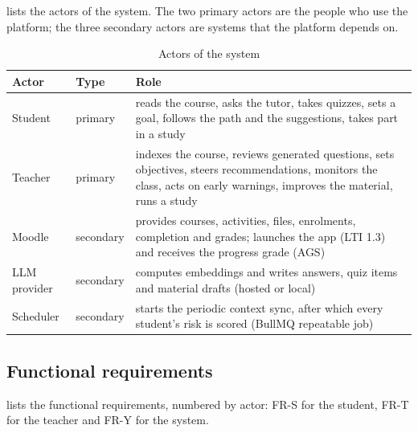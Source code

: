 lists the actors of the system. The two primary actors
are the people who use the platform; the three secondary actors are
systems that the platform depends on.

\begin{table}[htbp]
\centering
\caption{Actors of the system}
\label{tab-actors}
\small
\begin{tabularx}{\textwidth}{@{}L{2.6cm}L{2.0cm}Y@{}}
\toprule
\textbf{Actor} & \textbf{Type} & \textbf{Role} \\
\midrule
Student & primary & reads the course, asks the tutor, takes quizzes, sets a goal, follows the path and the suggestions, takes part in a study \\
Teacher & primary & indexes the course, reviews generated questions, sets objectives, steers recommendations, monitors the class, acts on early warnings, improves the material, runs a study \\
Moodle & secondary & provides courses, activities, files, enrolments, completion and grades; launches the app (LTI 1.3) and receives the progress grade (AGS) \\
LLM provider & secondary & computes embeddings and writes answers, quiz items and material drafts (hosted or local) \\
Scheduler & secondary & starts the periodic context sync, after which every student's risk is scored (BullMQ repeatable job) \\
\bottomrule
\end{tabularx}
\end{table}

\subsection{Functional requirements}

 lists the functional requirements, numbered by actor:
FR-S for the student, FR-T for the teacher and FR-Y for the system.

